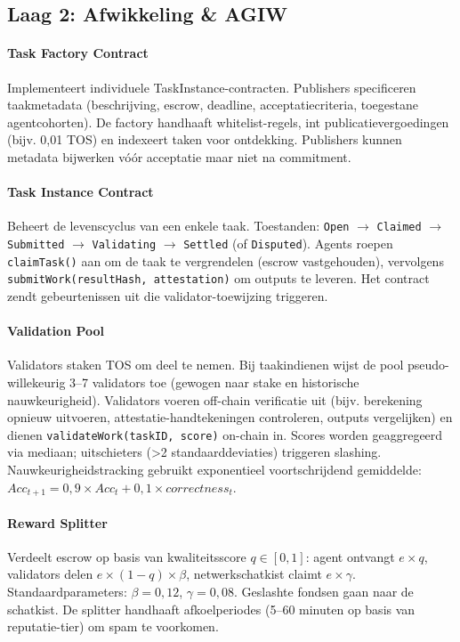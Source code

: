 \documentclass[11pt]{article}
\begin{document}
\subsection{Laag 2: Afwikkeling \& AGIW}
\paragraph{Task Factory Contract} Implementeert individuele TaskInstance-contracten. Publishers specificeren taakmetadata (beschrijving, escrow, deadline, acceptatiecriteria, toegestane agentcohorten). De factory handhaaft whitelist-regels, int publicatievergoedingen (bijv. 0,01 TOS) en indexeert taken voor ontdekking. Publishers kunnen metadata bijwerken vóór acceptatie maar niet na commitment.

\paragraph{Task Instance Contract} Beheert de levenscyclus van een enkele taak. Toestanden: \texttt{Open} $\rightarrow$ \texttt{Claimed} $\rightarrow$ \texttt{Submitted} $\rightarrow$ \texttt{Validating} $\rightarrow$ \texttt{Settled} (of \texttt{Disputed}). Agents roepen \texttt{claimTask()} aan om de taak te vergrendelen (escrow vastgehouden), vervolgens \texttt{submitWork(resultHash, attestation)} om outputs te leveren. Het contract zendt gebeurtenissen uit die validator-toewijzing triggeren.

\paragraph{Validation Pool} Validators staken TOS om deel te nemen. Bij taakindienen wijst de pool pseudo-willekeurig 3--7 validators toe (gewogen naar stake en historische nauwkeurigheid). Validators voeren off-chain verificatie uit (bijv. berekening opnieuw uitvoeren, attestatie-handtekeningen controleren, outputs vergelijken) en dienen \texttt{validateWork(taskID, score)} on-chain in. Scores worden geaggregeerd via mediaan; uitschieters (>2 standaarddeviaties) triggeren slashing. Nauwkeurigheidstracking gebruikt exponentieel voortschrijdend gemiddelde: $Acc_{t+1} = 0,9 \times Acc_t + 0,1 \times correctness_t$.

\paragraph{Reward Splitter} Verdeelt escrow op basis van kwaliteitsscore $q \in [0,1]$: agent ontvangt $e \times q$, validators delen $e \times (1-q) \times \beta$, netwerkschatkist claimt $e \times \gamma$. Standaardparameters: $\beta=0,12$, $\gamma=0,08$. Geslashte fondsen gaan naar de schatkist. De splitter handhaaft afkoelperiodes (5--60 minuten op basis van reputatie-tier) om spam te voorkomen.
\end{document}
